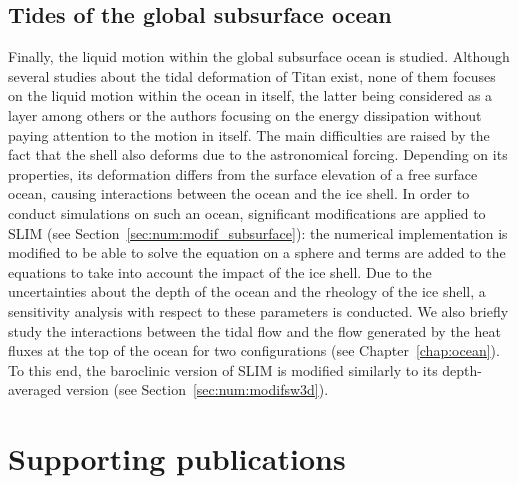 \subsection{Tides of the global subsurface ocean}
Finally, the liquid motion within the global subsurface ocean is studied. Although several studies about the tidal deformation of Titan exist, none of them focuses on the liquid motion within the ocean in itself, the latter being considered as a layer among others or the authors focusing on the energy dissipation without paying attention to the motion in itself. The main difficulties are raised by the fact that the shell also deforms due to the astronomical forcing. Depending on its properties, its deformation differs from the surface elevation of a free surface ocean, causing interactions between the ocean and the ice shell. In order to conduct simulations on such an ocean, significant modifications are applied to SLIM (see Section~\ref{sec:num:modif_subsurface}): the numerical implementation is modified to be able to solve the equation on a sphere and terms are added to the equations to take into account the impact of the ice shell. Due to the uncertainties about the depth of the ocean and the rheology of the ice shell, a sensitivity analysis with respect to these parameters is conducted. We also briefly study the interactions between the tidal flow and the flow generated by the heat fluxes at the top of the ocean for two configurations (see Chapter~\ref{chap:ocean}). To this end, the baroclinic version of SLIM is modified similarly to its depth-averaged version (see Section~\ref{sec:num:modifsw3d}).


\clearpage

\section*{Supporting publications}


